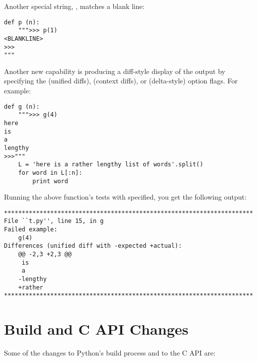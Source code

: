 \documentclass{howto}
\begin{document}
Another special string, , matches a blank line:

\begin{verbatim}
def p (n):
    """>>> p(1)
<BLANKLINE>
>>>
"""
\end{verbatim}

Another new capability is producing a diff-style display of the output
by specifying the  (unified diffs),
 (context diffs), or
 (delta-style) option flags.  For example:

\begin{verbatim}
def g (n):
    """>>> g(4)
here
is
a
lengthy
>>>"""
    L = 'here is a rather lengthy list of words'.split()
    for word in L[:n]:
        print word
\end{verbatim}

Running the above function's tests with
 specified, you get the following output:

\begin{verbatim}
**********************************************************************
File ``t.py'', line 15, in g
Failed example:
    g(4)
Differences (unified diff with -expected +actual):
    @@ -2,3 +2,3 @@
     is
     a
    -lengthy
    +rather
**********************************************************************
\end{verbatim}


\section{Build and C API Changes}

Some of the changes to Python's build process and to the C API are:
\end{document}

